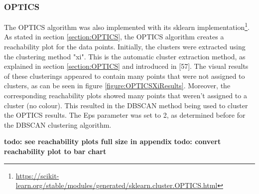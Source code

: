 \subsubsection{OPTICS}
The OPTICS algorithm was also implemented with its sklearn implementation\footnote{\url{https://scikit-learn.org/stable/modules/generated/sklearn.cluster.OPTICS.html}}. As stated in section \ref{section:OPTICS}, the OPTICS algorithm creates a reachability plot for the data points. Initially, the clusters were extracted using the clustering method "xi". This is the automatic cluster extraction method, as explained in section \ref{section:OPTICS} and introduced in \textcite{OPTICS}[57]. The visual results of these clusterings appeared to contain many points that were not assigned to clusters, as can be seen in figure \ref{figure:OPTICSXiResults}. Moreover, the corresponding reachability plots showed many points that weren't assigned to a cluster (no colour). This resulted in the DBSCAN method being used to cluster the OPTICS results. The Eps parameter was set to 2, as determined before for the DBSCAN clustering algorithm.

\textbf{todo: see reachability plots full size in appendix}
\textbf{todo: convert reachability plot to bar chart}


